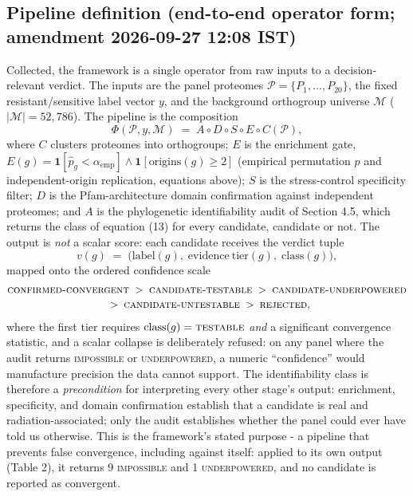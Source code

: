 \documentclass[12pt,a4paper]{article}
\begin{document}
\subsection{Pipeline definition (end-to-end operator form; amendment 2026-09-27 12:08 IST)}
Collected, the framework is a single operator from raw inputs to a decision-relevant verdict. The inputs are the panel proteomes $\mathcal{P} = \{P_1, \dots, P_{20}\}$, the fixed resistant/sensitive label vector $y$, and the background orthogroup universe $\mathcal{M}$ ($|\mathcal{M}| = 52{,}786$). The pipeline is the composition
\begin{equation}
\Phi(\mathcal{P}, y, \mathcal{M}) \;=\; A \circ D \circ S \circ E \circ C(\mathcal{P}),
\end{equation}
where $C$ clusters proteomes into orthogroups; $E$ is the enrichment gate, $E(g) = \mathbf{1}[\hat{p}_g < \alpha_{\mathrm{emp}}] \wedge \mathbf{1}[\text{origins}(g) \ge 2]$ (empirical permutation $p$ and independent-origin replication, equations above); $S$ is the stress-control specificity filter; $D$ is the Pfam-architecture domain confirmation against independent proteomes; and $A$ is the phylogenetic identifiability audit of Section 4.5, which returns the class of equation (13) for every candidate, candidate or not. The output is \emph{not} a scalar score: each candidate receives the verdict tuple
\begin{equation}
v(g) \;=\; \bigl( \mathrm{label}(g),\; \mathrm{evidence\ tier}(g),\; \mathrm{class}(g) \bigr),
\end{equation}
mapped onto the ordered confidence scale
\begin{equation}
\begin{array}{@{}c@{}} \textsc{confirmed-convergent} \;>\; \textsc{candidate-testable} \;>\; \textsc{candidate-underpowered} \\[2pt] {} \;>\; \textsc{candidate-untestable} \;>\; \textsc{rejected}, \end{array}
\end{equation}
where the first tier requires $\mathrm{class}(g) = \textsc{testable}$ \emph{and} a significant convergence statistic, and a scalar collapse is deliberately refused: on any panel where the audit returns \textsc{impossible} or \textsc{underpowered}, a numeric ``confidence'' would manufacture precision the data cannot support. The identifiability class is therefore a \emph{precondition} for interpreting every other stage's output: enrichment, specificity, and domain confirmation establish that a candidate is real and radiation-associated; only the audit establishes whether the panel could ever have told us otherwise. This is the framework's stated purpose - a pipeline that prevents false convergence, including against itself: applied to its own output (Table 2), it returns 9 \textsc{impossible} and 1 \textsc{underpowered}, and no candidate is reported as convergent.
\end{document}
